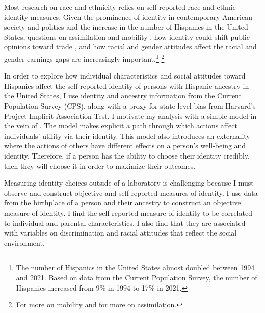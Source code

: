 \documentclass[12pt, fullpage]{article}
\begin{document}
Most research on race and ethnicity relies on self-reported race and ethnic identity measures. Given the prominence of identity in contemporary American society and politics and the increase in the number of Hispanics in the United States, questions on assimilation and mobility \citep{chettyUnitedStatesStill2014,abramitzkyNationImmigrantsAssimilation2014}, how identity could shift public opinions toward trade \citep{grossmanIdentityPoliticsTrade2021}, and how racial and gender attitudes affect the racial and gender earnings gaps \citep{charlesPrejudiceWagesEmpirical2008,charlesEffectsSexismAmerican2018} are increasingly important.\footnote{The number of Hispanics in the United States almost doubled between 1994 and 2021. Based on data from the Current Population Survey, the number of Hispanics increased from 9\% in 1994 to 17\% in 2021.} \footnote{For more on mobility\citet{chettyEffectsExposureBetter2016,chettyFadingAmericanDream2017,chettyWhereLandOpportunity2014} and \citet{abramitzkyImmigrantsAssimilateMore2020a,abramitzkyCulturalAssimilationAge2016,chettyWhereLandOpportunity2014} for more on assimilation.}

In order to explore how individual characteristics and social attitudes toward Hispanics affect the self-reported identity of persons with Hispanic ancestry in the United States, I use identity and ancestry information from the Current Population Survey (CPS), along with a proxy for state-level bias from Harvard's Project Implicit Association Test. I motivate my analysis with a simple model in the vein of \citet{akerlofEconomicsIdentity2000}. The model makes explicit a path through which actions affect individuals' utility via their identity. This model also introduces an externality where the actions of others have different effects on a person's well-being and identity. Therefore, if a person has the ability to choose their identity credibly, then they will choose it in order to maximize their outcomes.

Measuring identity choices outside of a laboratory is challenging because I must observe and construct objective and self-reported measures of identity. I use data from the birthplace of a person and their ancestry to construct an objective measure of identity. I find the self-reported measure of identity to be correlated to individual and parental characteristics. I also find that they are associated with variables on discrimination and racial attitudes that reflect the social environment. 
\end{document}
